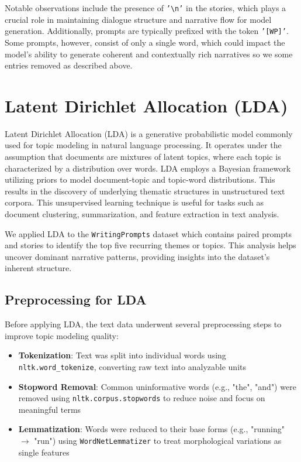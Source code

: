 \documentclass[11pt]{article}
\begin{document}
Notable observations include the presence of \texttt{'\textbackslash n'} in the stories, which plays a crucial role in maintaining dialogue structure and narrative flow for model generation. Additionally, prompts are typically prefixed with the token \texttt{'[WP]'}. Some prompts, however, consist of only a single word, which could impact the model's ability to generate coherent and contextually rich narratives so we some entries removed as described above.


\section{Latent Dirichlet Allocation (LDA)}
Latent Dirichlet Allocation (LDA) is a generative probabilistic model commonly used for topic modeling in natural language processing. It operates under the assumption that documents are mixtures of latent topics, where each topic is characterized by a distribution over words. LDA employs a Bayesian framework utilizing priors to model document-topic and topic-word distributions. This results in the discovery of underlying thematic structures in unstructured text corpora. This unsupervised learning technique is useful for tasks such as document clustering, summarization, and feature extraction in text analysis. 

We applied LDA to the \texttt{WritingPrompts} dataset which contains paired prompts and stories to identify the top five recurring themes or topics. This analysis helps uncover dominant narrative patterns, providing insights into the dataset’s inherent structure.


\subsection{Preprocessing for LDA}
Before applying LDA, the text data underwent several preprocessing steps to improve topic modeling quality:

\begin{itemize}
    \item \textbf{Tokenization}: Text was split into individual words using \texttt{nltk.word\_tokenize}, converting raw text into analyzable units
    
    \item \textbf{Stopword Removal}: Common uninformative words (e.g., "the", "and") were removed using \texttt{nltk.corpus.stopwords} to reduce noise and focus on meaningful terms
    
    \item \textbf{Lemmatization}: Words were reduced to their base forms (e.g., "running" $\rightarrow$ "run") using \texttt{WordNetLemmatizer} to treat morphological variations as single features
\end{itemize}
\end{document}

